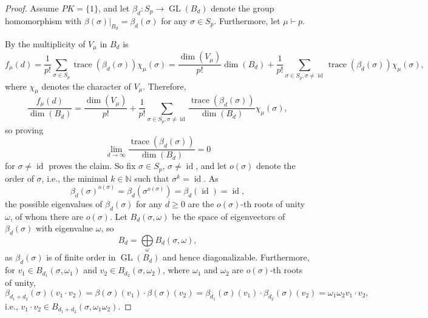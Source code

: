 \documentclass[a4paper]{amsart}
\def\N{{\mathbb{N}}}
\DeclareMathOperator{\GL}{\mathrm{GL}}
\DeclareMathOperator{\trace}{\mathrm{trace}}
\DeclareMathOperator{\id}{\mathrm{id}}
\begin{document}
\begin{proof}
	Assume $PK=\{1\}$,
	and let $\beta_d:S_p\to\GL(B_d)$ denote the group homomorphism with $\beta(\sigma)|_{B_d}=\beta_d(\sigma)$ for any $\sigma\in S_p$.
	Furthermore, let $\mu\vdash p$.

	By \cite[Cor. 2.16]{FH04} the multiplicity of $V_\mu$ in $B_d$ is
	\begin{displaymath}
		f_\mu(d)=\frac{1}{p!}\sum\limits_{\sigma\in S_p}\trace(\beta_d(\sigma))\chi_\mu(\sigma)=
		\frac{\dim(V_\mu)}{p!}\dim(B_d)+\frac{1}{p!}\sum\limits_{\sigma\in S_p,\sigma\neq\id}\trace(\beta_d(\sigma))\chi_\mu(\sigma),
	\end{displaymath}
	where $\chi_\mu$ denotes the character of $V_\mu$.
	Therefore,
	\begin{displaymath}
		\frac{f_\mu(d)}{\dim(B_d)}=
		\frac{\dim(V_\mu)}{p!}+\frac{1}{p!}\sum\limits_{\sigma\in S_p,\sigma\neq\id}\frac{\trace(\beta_d(\sigma))}{\dim(B_d)}\chi_\mu(\sigma),
	\end{displaymath}
	so proving
	\begin{displaymath}
		\lim\limits_{d\to\infty}\frac{\trace(\beta_d(\sigma))}{\dim(B_d)}=0
	\end{displaymath}
	for $\sigma\neq\id$ proves the claim.
	So fix $\sigma\in S_p$, $\sigma\neq\id$, and let $o(\sigma)$ denote the order of $\sigma$, i.e., the minimal $k\in\N$ such that $\sigma^k=\id$.
	As
	\begin{displaymath}
		\beta_d(\sigma)^{o(\sigma)}=
		\beta_d(\sigma^{o(\sigma)})=\beta_d(\id)=\id,
	\end{displaymath}
	the possible eigenvalues of $\beta_d(\sigma)$ for any $d\geq 0$ are the $o(\sigma)$-th roots of unity $\omega$, of whom there are $o(\sigma)$.
	Let $B_d(\sigma,\omega)$ be the space of eigenvectors of $\beta_d(\sigma)$ with eigenvalue $\omega$, so
	\begin{displaymath}
		B_d=\bigoplus\limits_{\omega}B_d(\sigma,\omega),
	\end{displaymath}
	as $\beta_d(\sigma)$ is of finite order in $\GL(B_d)$ and hence diagonalizable.
	Furthermore, for $v_1\in B_{d_1}(\sigma,\omega_1)$ and $v_2\in B_{d_2}(\sigma,\omega_2)$,
	where $\omega_1$ and $\omega_2$ are $o(\sigma)$-th roots of unity,
	\begin{displaymath}
		\beta_{d_1+d_2}(\sigma)(v_1\cdot v_2)=
		\beta(\sigma)(v_1)\cdot\beta(\sigma)(v_2)=
		\beta_{d_1}(\sigma)(v_1)\cdot\beta_{d_2}(\sigma)(v_2)=
		\omega_1\omega_2v_1\cdot v_2,	
	\end{displaymath}
	i.e., $v_1\cdot v_2\in B_{d_1+d_2}(\sigma,\omega_1\omega_2)$.

\end{proof}
\end{document}
